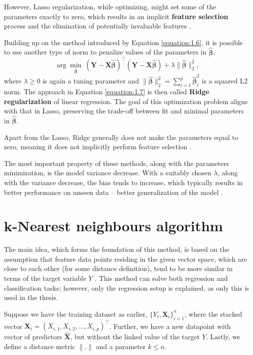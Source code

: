 However, Lasso regularization, while optimizing, might set some of the parameters exactly to zero, which results in an implicit \textbf{feature selection} process and the elimination of potentially invaluable features \cite{islp}. 
\newline
\par
Building up on the method introduced by Equation \eqref{equation:1.6}, it is possible to use another type of norm to penalize values of the parameters in $\bm{\hat{\beta}}$.
\begin{equation}
    \label{equation:1.7}
    \arg \min_{\bm{\hat{\beta}}} \> (\bm{Y} - \textbf{X}\bm{\hat{\beta}})^\top(\bm{Y} - \textbf{X}\bm{\hat{\beta}}) + \lambda \|\bm{\hat{\beta}}\|_2^2,
\end{equation}
where $\lambda \geq 0$ is again a tuning parameter and $\|\bm{\hat{\beta}}\|_2^2 = \sum_{i=1}^{p}\bm{\hat{\beta}}^2_{i}$ is a squared L2 norm. The approach in Equation \eqref{equation:1.7} is then called \textbf{Ridge regularization} of linear regression.
The goal of this optimization problem aligns with that in Lasso, preserving the trade-off between fit and minimal parameters in $\bm{\hat{\beta}}$. 

Apart from the Lasso, Ridge generally does not make the parameters equal to zero, meaning it does not implicitly perform feature selection \cite{islp}.

The most important property of these methods, along with the parameters minimization, is the model variance decrease. With a suitably chosen $\lambda$, along with the variance decrease, the bias tends to increase, which typically results in 
better performance on unseen data – better generalization of the model \cite{islp}.   

\section{k-Nearest neighbours algorithm}

The main idea, which forms the foundation of this method, is based on the assumption that feature data points residing in the given vector space, which
are close to each other (for some distance definition), tend to be more similar in terms of the target variable $Y$ \cite{skiena}. This method can solve both regression and classification tasks; however, 
only the regression setup is explained, as only this is used in the thesis.

Suppose we have the training dataset as earlier, $\{ Y_i, \mathbf{X}_i \}_{i=1}^{n}$, where the stacked vector $\mathbf{X}_i = (X_{i, 1}, X_{i, 2}, \ldots, X_{i, p})^\top$.
Further, we have a new datapoint with vector of predictors $\mathbf{\hat{X}}$, but without the linked value of the target $Y$. Lastly, we define a distance metric $\|.\|$ and a parameter $k \leq n$.

